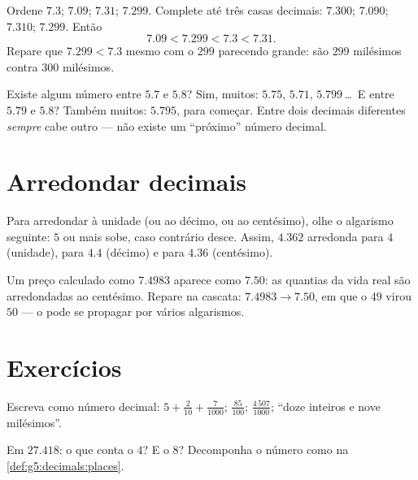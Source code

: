 \begin{example}\label{ex:g5:decimals:order}
Ordene $7.3$; $7.09$; $7.31$; $7.299$. Complete até três casas
decimais: $7.300$; $7.090$; $7.310$; $7.299$. Então
\[
7.09 < 7.299 < 7.3 < 7.31 .
\]
Repare que $7.299 < 7.3$ mesmo com o $299$ parecendo grande: são
$299$ milésimos contra $300$ milésimos.
\end{example}

\begin{example}\label{ex:g5:decimals:between}
Existe algum número entre $5.7$ e $5.8$? Sim, muitos: $5.75$,
$5.71$, $5.799$\,\dots\ E entre $5.79$ e $5.8$? Também muitos:
$5.795$, para começar. Entre dois decimais diferentes \emph{sempre}
cabe outro --- não existe um ``próximo'' número decimal.
\end{example}

\section{Arredondar decimais}

\begin{definition}[Arredondamento]\label{def:g5:decimals:round}
Para arredondar à unidade (ou ao décimo, ou ao centésimo), olhe o
algarismo seguinte: $5$ ou mais sobe, caso contrário desce. Assim,
$4.362$ arredonda para $4$ (unidade), para $4.4$ (décimo) e para
$4.36$ (centésimo).
\end{definition}

\begin{example}\label{ex:g5:decimals:money}
Um preço calculado como $7.4983$ aparece como $7.50$: as quantias da
vida real são arredondadas ao centésimo. Repare na cascata:
$7.4983 \to 7.50$, em que o $49$ virou $50$ --- o  pode
se propagar por vários algarismos.
\end{example}

\section{Exercícios}

\begin{exercise}[$\star$]\label{exo:g5:decimals:1}
Escreva como número decimal: $5 + \frac{2}{10} + \frac{7}{1000}$;
\quad $\frac{85}{100}$; \quad $\frac{4\,507}{1000}$; \quad ``doze
inteiros e nove milésimos''.
\end{exercise}

\begin{exercise}[$\star$]\label{exo:g5:decimals:2}
Em $27.418$: o que conta o $4$? E o $8$? Decomponha o número como na
\cref{def:g5:decimals:places}.
\end{exercise}

